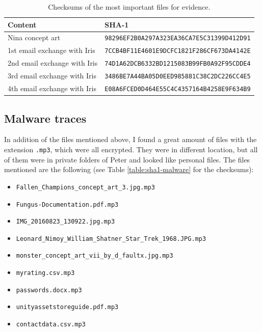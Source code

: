 \documentclass[12pt]{article}
\begin{document}
\begin{table}[!ht]
    \centering
    \begin{tabular}{ll}
    \toprule
        \textbf{Content} & \textbf{SHA-1} \\
        \midrule
        Nina concept art & \texttt{98296EF2B0A297A323EA36CA7E5C31399D412D91} \\
        1st email exchange with Iris & \texttt{7CCB4BF11E4601E9DCFC1821F286CF673DA4142E} \\
        2nd email exchange with Iris & \texttt{74D1A62DCB6332BD1215083B99FB0A92F95CDDE4} \\
        3rd email exchange with Iris & \texttt{3486BE7A44BA05D0EED985881C38C2DC226CC4E5} \\
        4th email exchange with Iris & \texttt{E08A6FCED0D464E55C4C4357164B4258E9F634B9} \\
    \bottomrule
    \end{tabular}
    \caption{Checksums of the most important files for evidence.}
    \label{table:sha1}
\end{table}

\subsection{Malware traces}

In addition of the files mentioned above, I found a great amount of files with the extension \texttt{.mp3}, which were all encrypted. They were in different location, but all of them were in private folders of Peter and looked like personal files.
The files mentioned are the following (see Table \ref{table:sha1-malware} for the checksums):
\begin{itemize} 
    \itemsep-0.5em 
    \item \texttt{Fallen\_Champions\_concept\_art\_3.jpg.mp3}
    \item \texttt{Fungus-Documentation.pdf.mp3}
    \item \texttt{IMG\_20160823\_130922.jpg.mp3}
    \item \texttt{Leonard\_Nimoy\_William\_Shatner\_Star\_Trek\_1968.JPG.mp3}
    \item \texttt{monster\_concept\_art\_vii\_by\_d\_faultx.jpg.mp3}
    \item \texttt{myrating.csv.mp3}
    \item \texttt{passwords.docx.mp3}
    \item \texttt{unityassetstoreguide.pdf.mp3}
    \item \texttt{contactdata.csv.mp3}
\end{itemize}
\end{document}
